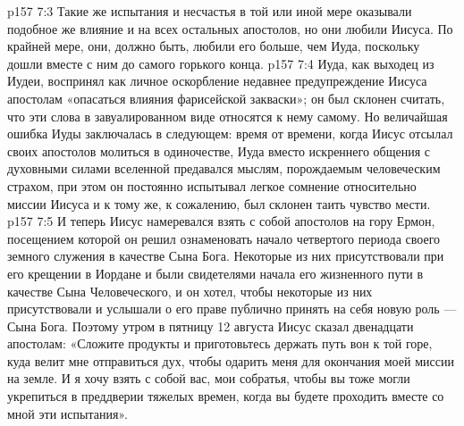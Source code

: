 \vs p157 7:3 Такие же испытания и несчастья в той или иной мере оказывали подобное же влияние и на всех остальных апостолов, но они любили Иисуса. По крайней мере, они, должно быть, любили его больше, чем Иуда, поскольку дошли вместе с ним до самого горького конца.
\vs p157 7:4 Иуда, как выходец из Иудеи, воспринял как личное оскорбление недавнее предупреждение Иисуса апостолам «опасаться влияния фарисейской закваски»; он был склонен считать, что эти слова в завуалированном виде относятся к нему самому. Но величайшая ошибка Иуды заключалась в следующем: время от времени, когда Иисус отсылал своих апостолов молиться в одиночестве, Иуда вместо искреннего общения с духовными силами вселенной предавался мыслям, порождаемым человеческим страхом, при этом он постоянно испытывал легкое сомнение относительно миссии Иисуса и к тому же, к сожалению, был склонен таить чувство мести.
\vs p157 7:5 \pc И теперь Иисус намеревался взять с собой апостолов на гору Ермон, посещением которой он решил ознаменовать начало четвертого периода своего земного служения в качестве Сына Бога. Некоторые из них присутствовали при его крещении в Иордане и были свидетелями начала его жизненного пути в качестве Сына Человеческого, и он хотел, чтобы некоторые из них присутствовали и услышали о его праве публично принять на себя новую роль --- Сына Бога. Поэтому утром в пятницу 12 августа Иисус сказал двенадцати апостолам: «Сложите продукты и приготовьтесь держать путь вон к той горе, куда велит мне отправиться дух, чтобы одарить меня для окончания моей миссии на земле. И я хочу взять с собой вас, мои собратья, чтобы вы тоже могли укрепиться в преддверии тяжелых времен, когда вы будете проходить вместе со мной эти испытания».
